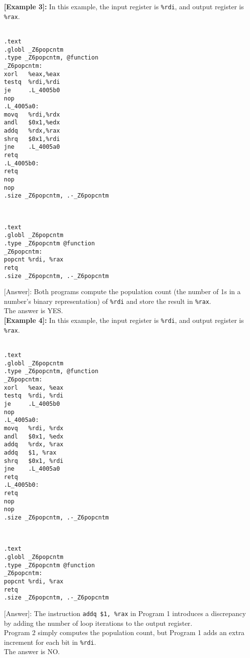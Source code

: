 \noindent\textbf{[Example 3]:} In this example, the input register is \texttt{\%rdi}, and output register is \texttt{\%rax}.\\
\text{[Program 1]:}\\
\begin{lstlisting}
.text
.globl _Z6popcntm
.type _Z6popcntm, @function
_Z6popcntm:
xorl   %eax,%eax
testq  %rdi,%rdi
je     .L_4005b0
nop
.L_4005a0:
movq   %rdi,%rdx
andl   $0x1,%edx
addq   %rdx,%rax
shrq   $0x1,%rdi
jne    .L_4005a0
retq
.L_4005b0:
retq
nop
nop
.size _Z6popcntm, .-_Z6popcntm
\end{lstlisting}
\text{[Program 2]:}\\
\begin{lstlisting}
.text
.globl _Z6popcntm
.type _Z6popcntm @function
_Z6popcntm:
popcnt %rdi, %rax
retq
.size _Z6popcntm, .-_Z6popcntm
\end{lstlisting}
[Answer]: Both programs compute the population count (the number of 1s in a number's binary representation) of \texttt{\%rdi} and store the result in \texttt{\%rax}.\\
The answer is YES.\\

\noindent\textbf{[Example 4]:} In this example, the input register is \texttt{\%rdi}, and output register is \texttt{\%rax}.\\
\text{[Program 1]:}\\
\begin{lstlisting}
.text
.globl _Z6popcntm
.type _Z6popcntm, @function
_Z6popcntm:
xorl   %eax, %eax
testq  %rdi, %rdi
je     .L_4005b0
nop
.L_4005a0:
movq   %rdi, %rdx
andl   $0x1, %edx
addq   %rdx, %rax
addq   $1, %rax
shrq   $0x1, %rdi
jne    .L_4005a0
retq
.L_4005b0:
retq
nop
nop
.size _Z6popcntm, .-_Z6popcntm
\end{lstlisting}
\text{[Program 2]:}\\
\begin{lstlisting}
.text
.globl _Z6popcntm
.type _Z6popcntm @function
_Z6popcntm:
popcnt %rdi, %rax
retq
.size _Z6popcntm, .-_Z6popcntm
\end{lstlisting}
[Answer]: The instruction \texttt{addq \$1, \%rax} in Program 1 introduces a discrepancy by adding the number of loop iterations to the output register.\\
Program 2 simply computes the population count, but Program 1 adds an extra increment for each bit in \texttt{\%rdi}.\\
The answer is NO.\\

